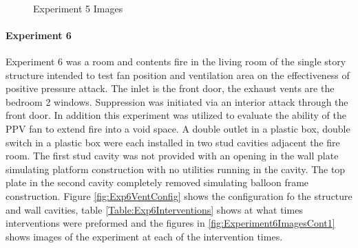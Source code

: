 \documentclass{article}
\begin{document}
\begin{figure}[H]
	\ContinuedFloat 
	\centering 
	 \ 
	\caption{Experiment 5 Images}
	\label{fig:Experiment5ImagesCont3} 
\end{figure}

\clearpage

\paragraph{Experiment 6}\mbox{}

Experiment 6 was a room and contents fire in the living room of the single story structure intended to test fan position and ventilation area on the effectiveness of positive pressure attack. The inlet is the front door, the exhaust vents are the bedroom 2 windows. Suppression was initiated via an interior attack through the front door. In addition this experiment was utilized to evaluate the ability of the PPV fan to extend fire into a void space. A double outlet in a plastic box, double switch in a plastic box were each installed in two stud cavities adjacent the fire room. The first stud cavity was not provided with an opening in the wall plate simulating platform construction with no utilities running in the cavity. The top plate in the second cavity completely removed simulating balloon frame construction. Figure \ref{fig:Exp6VentConfig} shows the configuration fo the structure and wall cavities, table \ref{Table:Exp6Interventions} shows at what times interventions were preformed and the figures in \ref{fig:Experiment6ImagesCont1} shows images of the experiment at each of the intervention times.
\end{document}
